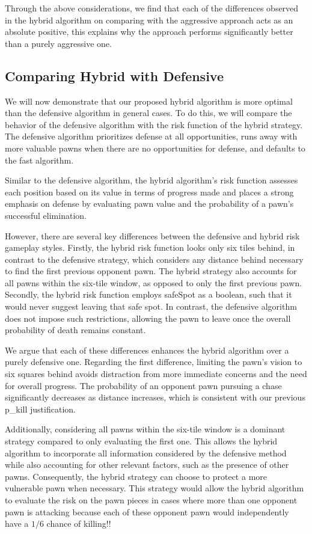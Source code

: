 \documentclass{article} %
\begin{document}
Through the above considerations, we find that each of the differences observed in the hybrid algorithm on comparing with the aggressive approach acts as an absolute positive, this explains why the approach performs significantly better than a purely aggressive one.

\subsection{Comparing Hybrid with Defensive}
We will now demonstrate that our proposed hybrid algorithm is more optimal than the defensive algorithm in general cases. To do this, we will compare the behavior of the defensive algorithm with the risk function of the hybrid strategy. The defensive algorithm prioritizes defense at all opportunities, runs away with more valuable pawns when there are no opportunities for defense, and defaults to the fast algorithm.

Similar to the defensive algorithm, the hybrid algorithm's risk function assesses each position based on its value in terms of progress made and places a strong emphasis on defense by evaluating pawn value and the probability of a pawn's successful elimination.

However, there are several key differences between the defensive and hybrid risk gameplay styles. Firstly, the hybrid risk function looks only six tiles behind, in contrast to the defensive strategy, which considers any distance behind necessary to find the first previous opponent pawn. The hybrid strategy also accounts for all pawns within the six-tile window, as opposed to only the first previous pawn. Secondly, the hybrid risk function employs safeSpot as a boolean, such that it would never suggest leaving that safe spot. In contrast, the defensive algorithm does not impose such restrictions, allowing the pawn to leave once the overall probability of death remains constant.

We argue that each of these differences enhances the hybrid algorithm over a purely defensive one. Regarding the first difference, limiting the pawn's vision to six squares behind avoids distraction from more immediate concerns and the need for overall progress. The probability of an opponent pawn pursuing a chase significantly decreases as distance increases, which is consistent with our previous p\_kill justification.

Additionally, considering all pawns within the six-tile window is a dominant strategy compared to only evaluating the first one. This allows the hybrid algorithm to incorporate all information considered by the defensive method while also accounting for other relevant factors, such as the presence of other pawns. Consequently, the hybrid strategy can choose to protect a more vulnerable pawn when necessary. This strategy would allow the hybrid algorithm to evaluate the risk on the pawn pieces in cases where more than one opponent pawn is attacking because each of these opponent pawn would independently have a $1/6$ chance of killing!!
\end{document}
